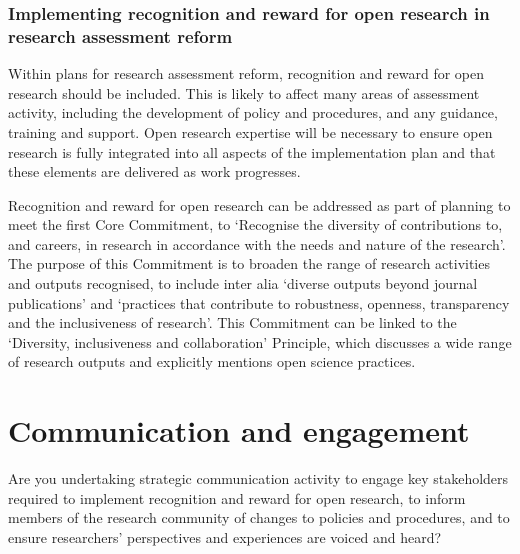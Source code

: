 \documentclass[
  letterpaper,
  DIV=11,
  numbers=noendperiod,
  oneside]{scrreprt}
\begin{document}
\subsection{Implementing recognition and reward for open research in
research assessment
reform}\label{implementing-recognition-and-reward-for-open-research-in-research-assessment-reform}

Within plans for research assessment reform, recognition and reward for
open research should be included. This is likely to affect many areas of
assessment activity, including the development of policy and procedures,
and any guidance, training and support. Open research expertise will be
necessary to ensure open research is fully integrated into all aspects
of the implementation plan and that these elements are delivered as work
progresses.

Recognition and reward for open research can be addressed as part of
planning to meet the first Core Commitment, to `Recognise the diversity
of contributions to, and careers, in research in accordance with the
needs and nature of the research'. The purpose of this Commitment is to
broaden the range of research activities and outputs recognised, to
include inter alia `diverse outputs beyond journal publications' and
`practices that contribute to robustness, openness, transparency and the
inclusiveness of research'. This Commitment can be linked to the
`Diversity, inclusiveness and collaboration' Principle, which discusses
a wide range of research outputs and explicitly mentions open science
practices.


\chapter{Communication and
engagement}\label{communication-and-engagement}

\begin{tcolorbox}[enhanced jigsaw, colback=white, toprule=.15mm, colframe=quarto-callout-color-frame, arc=.35mm, opacityback=0, bottomrule=.15mm, breakable, left=2mm, leftrule=.75mm, rightrule=.15mm]

Are you undertaking strategic communication activity to engage key
stakeholders required to implement recognition and reward for open
research, to inform members of the research community of changes to
policies and procedures, and to ensure researchers' perspectives and
experiences are voiced and heard?

\end{tcolorbox}
\end{document}
